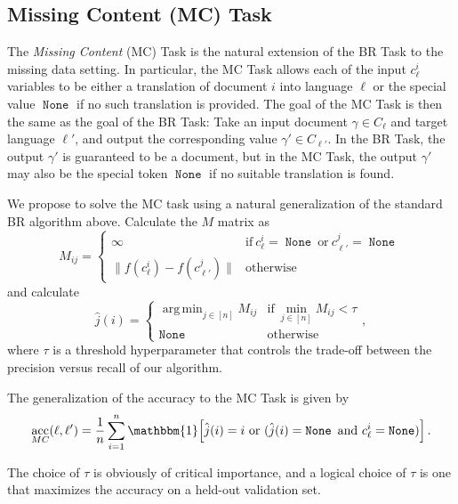 \documentclass[11pt]{article}
\newcommand{\ltwo}[1]{\lVert{#1}\rVert}
\newcommand{\indicator}[1]{\mathbbm{1}\!\left[{#1}\right]}
\newcommand{\defn}[1]{\emph{{#1}}}
\DeclareMathOperator*{\argmin}{arg\,min}
\DeclareMathOperator{\acc}{acc}
\DeclareMathOperator{\none}{\texttt{None}}
\begin{document}
\subsection{Missing Content (MC) Task}

The \defn{Missing Content} (MC) Task is the natural extension of the BR Task to the missing data setting.
In particular, the MC Task allows each of the input $c_\ell^i$ variables to be either a translation of document $i$ into language $\ell$ or the special value $\none$ if no such translation is provided.
The goal of the MC Task is then the same as the goal of the BR Task:
Take an input document $\gamma\in C_\ell$ and target language $\ell'$,
and output the corresponding value $\gamma' \in C_{\ell'}$.
In the BR Task, the output $\gamma'$ is guaranteed to be a document,
but in the MC Task, the output $\gamma'$ may also be the special token $\none$ if no suitable translation is found.

We propose to solve the MC task using a natural generalization of the standard BR algorithm above.
Calculate the $M$ matrix as
\begin{equation}
    M_{ij} = 
    \begin{cases}
        \infty & \text{if}~ c_{\ell}^i = \none ~\text{or}~ c_{\ell'}^j=\none \\
        \ltwo{ f (c_{\ell}^i) - f(c_{\ell'}^j ) } & \text{otherwise}
    \end{cases}
\end{equation}
and calculate
\begin{equation}
    \hat j(i) = 
    \begin{cases}
        \argmin_{j\in[n]} M_{ij} & \text{if}~ \min_{j\in[n]} M_{ij} < \tau \\
        \none & \text{otherwise}
    \end{cases}
    ,
\end{equation}
where $\tau$ is a threshold hyperparameter that controls the trade-off between the precision versus recall of our algorithm.

The generalization of the accuracy to the MC Task is given by
\begin{equation}
    \acc_{MC}(\ell,\ell') = \frac 1 n \sum_{i=1}^n \indicator{\hat j(i) = i ~\text{or}~ (\hat j(i) = \none ~\text{and}~ c_\ell^i = \none) }
    .
\end{equation}

The choice of $\tau$ is obviously of critical importance,
and a logical choice of $\tau$ is one that maximizes the accuracy on a held-out validation set.
\end{document}
